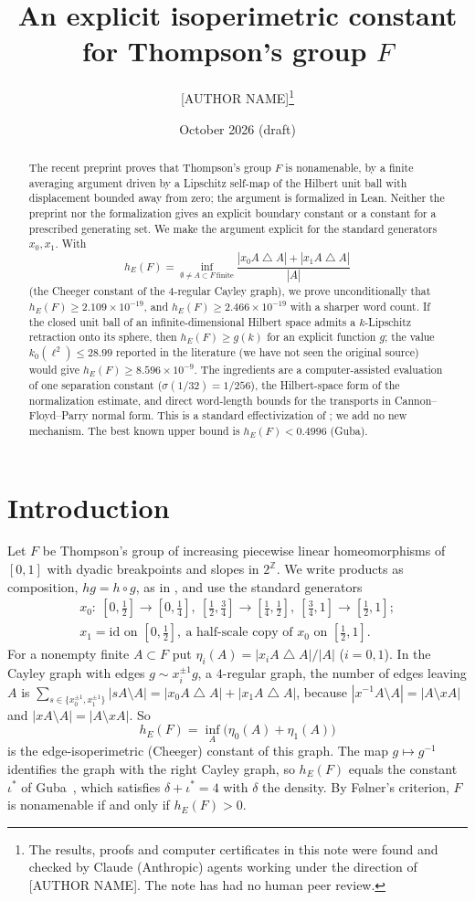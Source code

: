 \documentclass[11pt]{article}
\title{An explicit isoperimetric constant for Thompson's group $F$}
\author{[AUTHOR NAME]\thanks{The results, proofs and computer certificates in this note were found and
checked by Claude (Anthropic) agents working under the direction of [AUTHOR NAME]. The note has had
no human peer review.}}
\date{October 2026 (draft)}
\theoremstyle{definition}
\theoremstyle{remark}
\newcommand{\sd}{\mathbin{\triangle}}
\newcommand{\hE}{h_E}
\begin{document}
\maketitle

\begin{abstract}
The recent preprint \cite{OAI} proves that Thompson's group $F$ is nonamenable, by a finite
averaging argument driven by a Lipschitz self-map of the Hilbert unit ball with displacement bounded
away from zero; the argument is formalized in Lean. Neither the preprint nor the formalization gives
an explicit boundary constant or a constant for a prescribed generating set. We make the argument
explicit for the standard generators $x_0,x_1$. With
\[
  \hE(F)=\inf_{\emptyset\neq A\subset F\ \text{finite}}\frac{|x_0A\sd A|+|x_1A\sd A|}{|A|}
\]
(the Cheeger constant of the $4$-regular Cayley graph), we prove unconditionally that
$\hE(F)\ge 2.109\times10^{-19}$, and $\hE(F)\ge 2.466\times10^{-19}$ with a sharper word count.
If the closed unit ball of an infinite-dimensional Hilbert space admits a $k$-Lipschitz retraction
onto its sphere, then $\hE(F)\ge g(k)$ for an explicit function $g$; the value
$k_0(\ell^2)\le 28.99$ reported in the literature (we have not seen the original source) would give
$\hE(F)\ge 8.596\times10^{-9}$. The ingredients are a computer-assisted
evaluation of one separation constant ($\sigma(1/32)=1/256$), the Hilbert-space form of the
normalization estimate, and direct word-length bounds for the transports in Cannon--Floyd--Parry
normal form. This is a standard effectivization of \cite{OAI}; we add no new mechanism. The best
known upper bound is $\hE(F)<0.4996$ (Guba).
\end{abstract}

\section{Introduction}

Let $F$ be Thompson's group of increasing piecewise linear homeomorphisms of $[0,1]$ with dyadic
breakpoints and slopes in $2^{\mathbb Z}$. We write products as composition, $hg=h\circ g$, as in
\cite{OAI}, and use the standard generators
\begin{gather*}
x_0:\ [0,\tfrac12]\to[0,\tfrac14],\ [\tfrac12,\tfrac34]\to[\tfrac14,\tfrac12],\
[\tfrac34,1]\to[\tfrac12,1];\\
x_1=\mathrm{id}\text{ on }[0,\tfrac12],\ \text{a half-scale copy of $x_0$ on }[\tfrac12,1].
\end{gather*}
For a nonempty finite $A\subset F$ put $\eta_i(A)=|x_iA\sd A|/|A|$ ($i=0,1$). In the Cayley graph
with edges $g\sim x_i^{\pm1}g$, a $4$-regular graph, the number of edges leaving $A$ is
$\sum_{s\in\{x_0^{\pm1},x_1^{\pm1}\}}|sA\setminus A|=|x_0A\sd A|+|x_1A\sd A|$, because
$|x^{-1}A\setminus A|=|A\setminus xA|$ and $|xA\setminus A|=|A\setminus xA|$. So
\[
  \hE(F)=\inf_A\bigl(\eta_0(A)+\eta_1(A)\bigr)
\]
is the edge-isoperimetric (Cheeger) constant of this graph. The map $g\mapsto g^{-1}$ identifies the
graph with the right Cayley graph, so $\hE(F)$ equals the constant $\iota^*$ of
Guba~\cite{Guba2025}, which satisfies $\delta+\iota^*=4$ with $\delta$ the density.
By F{\o}lner's criterion, $F$ is nonamenable if and only if $\hE(F)>0$.
\end{document}
